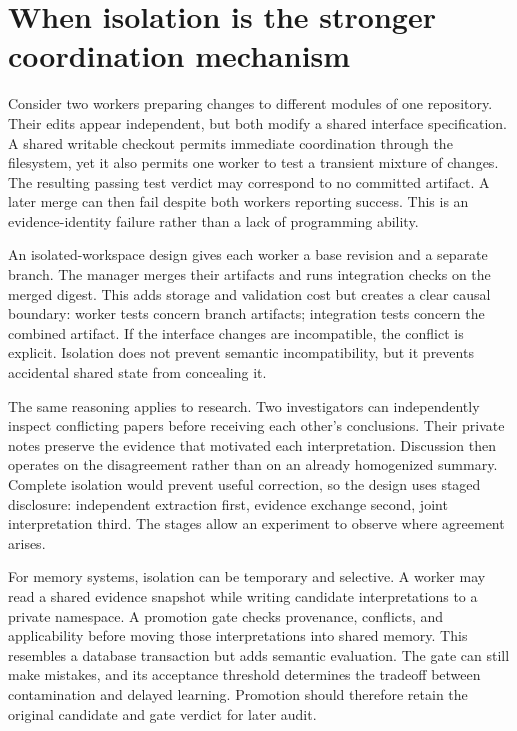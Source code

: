 \section{When isolation is the stronger coordination mechanism}\label{sec:C21:isolation}
Consider two workers preparing changes to different modules of one repository. Their edits appear independent, but both modify a shared interface specification. A shared writable checkout permits immediate coordination through the filesystem, yet it also permits one worker to test a transient mixture of changes. The resulting passing test verdict may correspond to no committed artifact. A later merge can then fail despite both workers reporting success. This is an evidence-identity failure rather than a lack of programming ability.

An isolated-workspace design gives each worker a base revision and a separate branch. The manager merges their artifacts and runs integration checks on the merged digest. This adds storage and validation cost but creates a clear causal boundary: worker tests concern branch artifacts; integration tests concern the combined artifact. If the interface changes are incompatible, the conflict is explicit. Isolation does not prevent semantic incompatibility, but it prevents accidental shared state from concealing it.

The same reasoning applies to research. Two investigators can independently inspect conflicting papers before receiving each other's conclusions. Their private notes preserve the evidence that motivated each interpretation. Discussion then operates on the disagreement rather than on an already homogenized summary. Complete isolation would prevent useful correction, so the design uses staged disclosure: independent extraction first, evidence exchange second, joint interpretation third. The stages allow an experiment to observe where agreement arises.

For memory systems, isolation can be temporary and selective. A worker may read a shared evidence snapshot while writing candidate interpretations to a private namespace. A promotion gate checks provenance, conflicts, and applicability before moving those interpretations into shared memory. This resembles a database transaction but adds semantic evaluation. The gate can still make mistakes, and its acceptance threshold determines the tradeoff between contamination and delayed learning. Promotion should therefore retain the original candidate and gate verdict for later audit.

